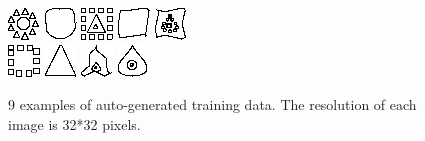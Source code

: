 \begin{figure}
\vspace{.5cm} %
\centering
\includegraphics[width=.15\linewidth]{ext/ex/1.png}\quad
\includegraphics[width=.15\linewidth]{ext/ex/2.png}\quad
\includegraphics[width=.15\linewidth]{ext/ex/3.png}\quad
\includegraphics[width=.15\linewidth]{ext/ex/4.png}\quad
\includegraphics[width=.15\linewidth]{ext/ex/5.png} \\
\vspace{1em}
\includegraphics[width=.15\linewidth]{ext/ex/6.png}\quad
\includegraphics[width=.15\linewidth]{ext/ex/7.png}\quad
\includegraphics[width=.15\linewidth]{ext/ex/8.png}\quad
\includegraphics[width=.15\linewidth]{ext/ex/9.png}
\caption{9 examples of auto-generated training data. The resolution of each image is 32*32 pixels.}
\label{fig:trainingExamples}
\vspace{.5cm} %
\end{figure}

